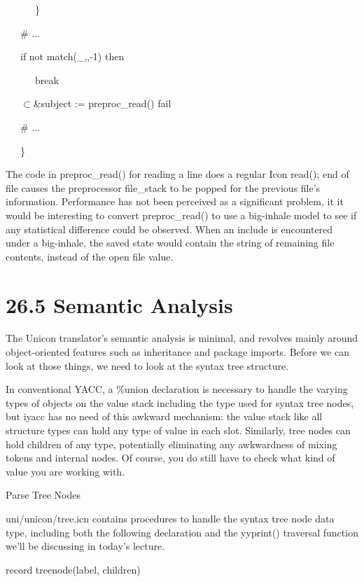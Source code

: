 {\ttfamily\mdseries
\ \ \ \ \ \ \}}

{\ttfamily\mdseries
\ \ \ \# ...}

{\ttfamily\mdseries
\ \ \ if not match({\textquotedbl}\_{\textquotedbl},,-1) then}

{\ttfamily\mdseries
\ \ \ \ \ \ break}

{\ttfamily\mdseries
\ \ \ ${\subset}$\&subject := preproc\_read() {\textbar} fail}

{\ttfamily\mdseries
\ \ \ \# ...}

{\ttfamily\mdseries
\ \ \ \}}

The code in preproc\_read() for reading a line does a regular Icon
read(); end of file causes the preprocessor file\_stack to be popped
for the previous file's information. Performance has not been
perceived as a significant problem, it it would be interesting to
convert preproc\_read() to use a big-inhale model to see if any
statistical difference could be observed. When an include is
encountered under a big-inhale, the saved state would contain the
string of remaining file contents, instead of the open file value.


\section[26.5 Semantic Analysis]{26.5 Semantic Analysis}

The Unicon translator's semantic analysis is minimal, and revolves
mainly around object-oriented features such as inheritance and package
imports. Before we can look at those things, we need to look at the
syntax tree structure.

In conventional YACC, a \%union declaration is necessary to handle the
varying types of objects on the value stack including the type used
for syntax tree nodes, but iyacc has no need of this awkward
mechanism: the value stack like all structure types can hold any type
of value in each slot. Similarly, tree nodes can hold children of any
type, potentially eliminating any awkwardness of mixing tokens and
internal nodes. Of course, you do still have to check what kind of
value you are working with.

{\sffamily
Parse Tree Nodes }

uni/unicon/tree.icn contains procedures to handle the syntax tree node
data type, including both the following declaration and the yyprint()
traversal function we'll be discussing in today's lecture.

{\ttfamily\mdseries
record treenode(label, children)}

